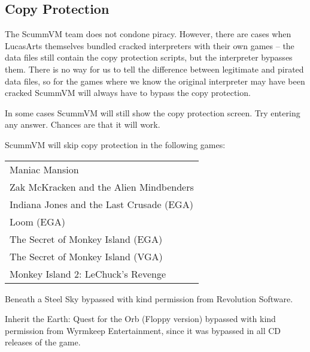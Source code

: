 \subsection{Copy Protection}

The ScummVM team does not condone piracy. However, there are cases when
LucasArts themselves bundled cracked interpreters with their own games --
the data files still contain the copy protection scripts, but the interpreter
bypasses them. There is no way for us to tell the difference between legitimate
and pirated data files, so for the games where we know the original interpreter
may have been cracked ScummVM will always have to bypass the copy protection.

In some cases ScummVM will still show the copy protection screen. Try entering
any answer. Chances are that it will work.

ScummVM will skip copy protection in the following games:

\begin{tabular}{l}
Maniac Mansion\\
Zak McKracken and the Alien Mindbenders\\
Indiana Jones and the Last Crusade (EGA)\\
Loom (EGA)\\
The Secret of Monkey Island (EGA)\\
The Secret of Monkey Island (VGA)\\
Monkey Island 2: LeChuck's Revenge\\
\end{tabular}

Beneath a Steel Sky bypassed with kind permission from Revolution Software.

Inherit the Earth: Quest for the Orb (Floppy version) bypassed with kind
permission from Wyrmkeep Entertainment, since it was bypassed in all CD
releases of the game.


